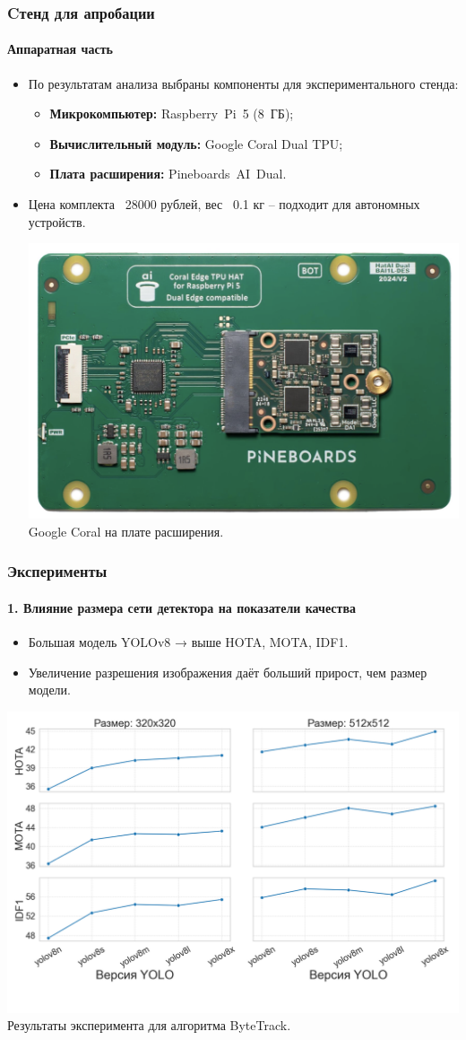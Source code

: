 \documentclass{beamer} %
\begin{document}
\begin{frame}
  \frametitle{Cтенд для апробации}
  \framesubtitle{Аппаратная часть}
  \begin{itemize}
      \item По результатам анализа выбраны компоненты для экспериментального стенда:
      \begin{itemize}
          \item \textbf{Микрокомпьютер:} Raspberry Pi 5 (8 ГБ);
          \item \textbf{Вычислительный модуль:} Google Coral Dual TPU;
          \item \textbf{Плата расширения:} Pineboards AI Dual.
      \end{itemize}
      \item Цена комплекта ~28000 рублей, вес ~0.1 кг -- подходит для автономных устройств.
      
      \centering
  \includegraphics[width=0.5\linewidth]{images/presentation/tpu.png}\\
  \small Google Coral на плате расширения.
  \end{itemize}
\end{frame}

\begin{frame}
    \frametitle{Эксперименты}
    \framesubtitle{1. Влияние размера сети детектора на показатели качества}
    \begin{itemize}
      \item Большая модель YOLOv8 → выше HOTA, MOTA, IDF1.
      \item Увеличение разрешения изображения даёт больший прирост, чем размер модели.
    \end{itemize}
    \centering
    \includegraphics[width=0.7\linewidth]{images/plots/yolo_size_vs_metric/ByteTrack.png}\\
    \small Результаты эксперимента для алгоритма ByteTrack.
\end{frame}
\end{document}
